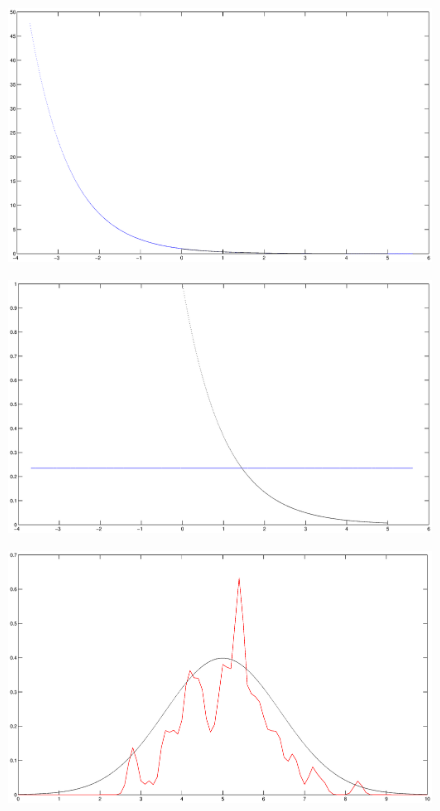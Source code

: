 \begin{figure}
\label{}
\includegraphics[scale=0.4]{exp-exp}
\caption{}
\end{figure}

\begin{figure}
\label{}
\includegraphics[scale=0.4]{exp-uni}
\caption{}
\end{figure}

\begin{figure}
\label{}
\includegraphics[scale=0.4]{nonpar-parzen-01}
\caption{}
\end{figure}

